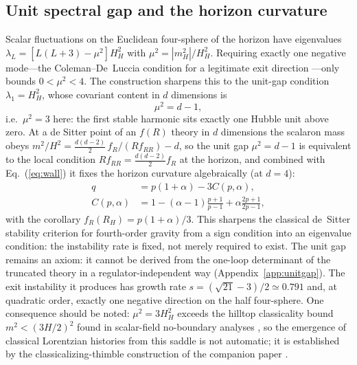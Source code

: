 \documentclass[aps,prd,twocolumn,superscriptaddress,nofootinbib,longbibliography]{revtex4-2}
\begin{document}
\subsection{Unit spectral gap and the horizon curvature}
Scalar fluctuations on the Euclidean four-sphere of the horizon have
eigenvalues $\lambda_L=[L(L+3)-\mu^2]H_H^2$ with
$\mu^2=|m_H^2|/H_H^2$. Requiring exactly one negative mode---the
Coleman--De~Luccia condition for a legitimate exit direction
\cite{ColemanDeLuccia1980}---only bounds
$0<\mu^2<4$. The construction sharpens this to the unit-gap condition
$\lambda_1=H_H^2$, whose covariant content in $d$ dimensions is
\begin{equation}
\mu^2=d-1 ,
\end{equation}
i.e.\ $\mu^2=3$ here: the first stable harmonic sits exactly one Hubble unit
above zero. At a de Sitter point of an $f(R)$ theory in $d$ dimensions the
scalaron mass obeys $m^2/H^2=\tfrac{d(d-2)}{2}\,f_R/(Rf_{RR})-d$, so the
unit gap $\mu^2=d-1$ is equivalent to the local condition
$R f_{RR}=\tfrac{d(d-2)}{2}f_R$ at the horizon, and combined with
Eq.~(\ref{eq:wall}) it fixes the horizon curvature algebraically (at $d=4$):
\begin{align}
q&=p(1+\alpha)-3C(p,\alpha),\nonumber\\
C(p,\alpha)&=1-(\alpha-1)\frac{p+1}{p-1}+\alpha\frac{2p+1}{2p-1},
\end{align}
with the corollary $f_R(R_H)=p(1+\alpha)/3$. This sharpens the classical
de~Sitter stability criterion for fourth-order gravity \cite{MSS1988} from a
sign condition into an eigenvalue condition: the instability rate is fixed,
not merely required to exist. The unit gap
remains an axiom: it cannot be derived from the one-loop determinant of the
truncated theory in a regulator-independent way
(Appendix~\ref{app:unitgap}). The exit instability it produces has growth rate
$s=(\sqrt{21}-3)/2\simeq0.791$ and, at quadratic order, exactly one negative
direction on the half four-sphere. One consequence should be noted:
$\mu^2=3H_H^2$ exceeds the hilltop classicality bound $m^2<(3H/2)^2$ found
in scalar-field no-boundary analyses \cite{HHH2008}, so the emergence of
classical Lorentzian histories from this saddle is not automatic; it is
established by the classicalizing-thimble construction of the companion
paper \cite{PandevII}.
\end{document}
